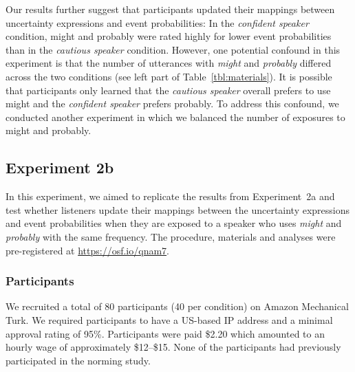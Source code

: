 \documentclass[man, floatsintext]{apa6}
\begin{document}

Our results further suggest that participants updated their mappings between uncertainty expressions and event probabilities: In the {\it confident speaker} condition, {\sc might} and {\sc probably} were rated highly for lower event probabilities than in the {\it cautious speaker} condition. However, one potential confound in this experiment is that the number of utterances with \textit{might} and \textit{probably} differed across the two conditions (see left part of Table~\ref{tbl:materials}). It is possible that participants only learned that the {\it cautious speaker} overall prefers to use {\sc might} and the {\it confident speaker} prefers {\sc probably}. To address this confound, we conducted another experiment in which we balanced the number of exposures to {\sc might} and {\sc probably}.

\subsection{Experiment 2b}

In this experiment, we aimed to replicate the results from Experiment~2a and test whether listeners update their 
mappings between the uncertainty expressions and event probabilities when they are exposed to a speaker who
uses \textit{might} and \textit{probably} with the same frequency.  The procedure, materials and analyses were pre-registered at \url{https://osf.io/qnam7}.
\subsubsection{Participants}
We recruited a total of 80 participants (40 per condition) on Amazon Mechanical Turk. 
We required participants to have a US-based IP address and a minimal approval rating 
of 95\%. Participants were paid \$2.20 which amounted to an hourly wage of approximately 
\$12--\$15. None of the participants had previously participated in the norming study.
\end{document}
